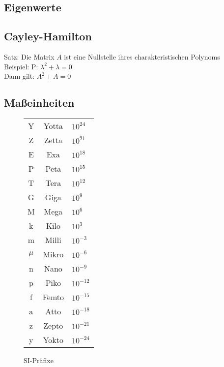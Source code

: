 	\subsection{Eigenwerte}
	\subsection{Cayley-Hamilton}
Satz: Die Matrix $A$ ist eine Nullstelle ihres charakteristischen Polynoms\\
		Beispiel: P: $\lambda^2 + \lambda = 0$\\
		Dann gilt: $A^2 + A = 0$


\subsection{Maßeinheiten}
	\begin{figure}[h]
		\begin{tabular}{ccl}
			Y & Yotta     & $10^{24}$ \\
			Z & Zetta     & $10^{21}$ \\
			E & Exa       & $10^{18}$ \\
			P & Peta      & $10^{15}$ \\
			T & Tera      & $10^{12}$ \\
			G & Giga      & $10^{9}$ \\
			M & Mega      & $10^{6}$ \\
			k & Kilo      & $10^{3}$ \\
			m & Milli     & $10^{-3}$ \\
			$\mu$ & Mikro & $10^{-6}$ \\
			n & Nano      & $10^{-9}$ \\
			p & Piko      & $10^{-12}$ \\
			f & Femto     & $10^{-15}$ \\
			a & Atto      & $10^{-18}$ \\
			z & Zepto     & $10^{-21}$ \\
			y & Yokto     & $10^{-24}$ \\
		\end{tabular}
		\caption{SI-Präfixe}
	\end{figure}

